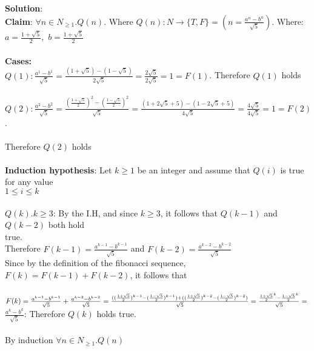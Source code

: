 \documentclass[11pt]{article}
\begin{document}
\begin{solution}
{\bf Solution}:\\
{\bf{Claim}}: $\forall n\in N_{\ge1}.Q(n)$. Where $Q(n): N\rightarrow \{T,F\} = \left (n = \frac{a^n - b^n}{\sqrt 5}\right )$. Where: $a=\frac{1+\sqrt 5}{2},$ $b=\frac{1+\sqrt 5}{2}$\\\\
{\bf Cases:}\\
\null\quad$Q(1):\frac{a^1-b^1}{\sqrt 5} = \frac{(1+\sqrt 5) - (1-\sqrt 5)}{2\sqrt 5} = \frac{2\sqrt 5}{2\sqrt 5}= 1 = F(1)$. Therefore $Q(1)$ holds\\\\
\null\quad$Q(2):\frac{a^2-b^2}{\sqrt 5} = \frac{(\frac{1+\sqrt 5}{2})^2 - (\frac{1-\sqrt 5}{2})^2}{\sqrt 5}= \frac{(1 + 2\sqrt 5 + 5)- (1-2\sqrt 5 + 5)}{4\sqrt 5} = \frac{4\sqrt 5}{4\sqrt 5} = 1 = F(2)$.\\\\
\null\qquad Therefore $Q(2)$ holds\\\\
{\bf Induction hypothesis}: Let $k\ge1$ be an integer and assume that $Q(i)$ is true  for any value \\\null\quad $1\le i\le k$\\\\
\null\quad$Q(k).k\ge3$: By the I.H, and since $k\ge3$, it follows that $Q(k-1)$ and $Q(k-2)$ both hold\\
\null\qquad true.\\
\null\qquad Therefore $F(k-1) = \frac{a^{k-1}-b^{k-1}}{\sqrt 5}$ and $F(k-2) = \frac{a^{k-2}-b^{k-2}}{\sqrt 5}$\\
\null\qquad Since by the definition of the fibonacci sequence, $F(k) = F(k-1) + F(k-2)$, it follows that\\\\
\null\qquad $F(k) = \frac{a^{k-1}-b^{k-1}}{\sqrt 5} + \frac{a^{k-2}-b^{k-2}}{\sqrt 5} = \frac{((\frac{1+\sqrt 5}{2})^{k-1}-(\frac{1-\sqrt 5}{2})^{k-1}) + ((\frac{1+\sqrt 5}{2})^{k-2}-(\frac{1-\sqrt 5}{2})^{k-2})}{\sqrt 5} = \frac{\frac{1+\sqrt 5}{2}^k -\frac{1-\sqrt 5}{2}^k}{\sqrt 5}=\\$
\null\qquad $\frac{a^k -b^k}{\sqrt 5}$: Therefore $Q(k)$ holds true.\\\\
By induction $\forall n\in N_{\ge1}.Q(n)$

\end{solution}
\end{document}
